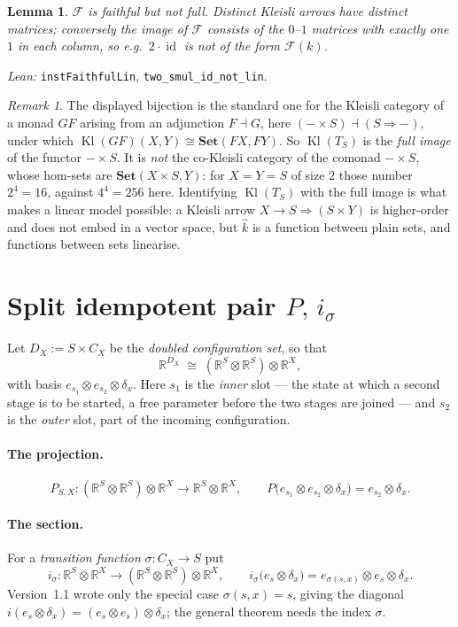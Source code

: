 \documentclass[12pt]{article}
\theoremstyle{plain}
\newtheorem{lemma}{Lemma}
\theoremstyle{remark}
\newtheorem*{remark}{Remark}
\newcommand{\Set}{\mathbf{Set}}
\newcommand{\id}{\operatorname{id}}
\newcommand{\RR}{\mathbb R}
\newcommand{\Kl}{\operatorname{Kl}}
\begin{document}
\begin{lemma}
$\mathcal F$ is faithful but not full. Distinct Kleisli arrows have distinct
matrices; conversely the image of $\mathcal F$ consists of the $0$--$1$ matrices
with exactly one $1$ in each column, so e.g.\ $2\cdot\id$ is not of the form
$\mathcal F(k)$.
\end{lemma}
\emph{Lean:} \verb|instFaithfulLin|, \verb|two_smul_id_not_lin|.

\begin{remark}
The displayed bijection is the standard one for the Kleisli category of a monad
$GF$ arising from an adjunction $F\dashv G$, here $(-\times S)\dashv(S\Rightarrow-)$,
under which $\Kl(GF)(X,Y)\cong\Set(FX,FY)$. So $\Kl(T_S)$ is the \emph{full image}
of the functor $-\times S$. It is \emph{not} the co-Kleisli category of the comonad
$-\times S$, whose hom-sets are $\Set(X\times S,Y)$: for $X=Y=S$ of size $2$ those
number $2^{4}=16$, against $4^{4}=256$ here. Identifying $\Kl(T_S)$ with the full
image is what makes a linear model possible:
a Kleisli arrow $X\to S\Rightarrow(S\times Y)$ is higher-order and does not
embed in a vector space, but $\widehat k$ is a function between plain sets, and
functions between sets linearise.
\end{remark}

\bigskip
\section{Split idempotent pair \texorpdfstring{$P,\,i_\sigma$}{P, i}}
\label{sec:split}

Let $D_X:=S\times C_X$ be the \emph{doubled configuration set}, so that
\[
\RR^{D_X}\;\cong\;(\RR^{S}\otimes\RR^{S})\otimes\RR^{X},
\]
with basis $e_{s_1}\otimes e_{s_2}\otimes\delta_x$. Here $s_1$ is the
\emph{inner} slot --- the state at which a second stage is to be started, a free
parameter before the two stages are joined --- and $s_2$ is the \emph{outer}
slot, part of the incoming configuration.

\paragraph{The projection.}
\[
P_{S,X}:(\RR^{S}\otimes\RR^{S})\otimes\RR^{X}\to \RR^{S}\otimes\RR^{X},
\qquad
P\bigl(e_{s_1}\otimes e_{s_2}\otimes\delta_x\bigr)=e_{s_2}\otimes\delta_x .
\]

\paragraph{The section.}
For a \emph{transition function} $\sigma:C_X\to S$ put
\[
i_\sigma:\RR^{S}\otimes\RR^{X}\to(\RR^{S}\otimes\RR^{S})\otimes\RR^{X},
\qquad
i_\sigma\bigl(e_s\otimes\delta_x\bigr)=e_{\sigma(s,x)}\otimes e_{s}\otimes\delta_x .
\]
Version~1.1 wrote only the special case $\sigma(s,x)=s$, giving the diagonal
$i(e_s\otimes\delta_x)=(e_s\otimes e_s)\otimes\delta_x$; the general theorem
needs the index $\sigma$.
\end{document}
